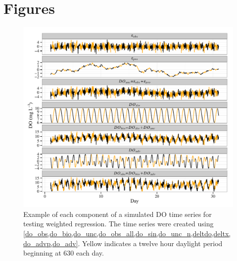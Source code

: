 \documentclass[letterpaper,12pt,oneside]{article}\usepackage[]{graphicx}\usepackage[]{color}
\makeatletter
\def\maxwidth{ %
  \ifdim\Gin@nat@width>\linewidth
    \linewidth
  \else
    \Gin@nat@width
  \fi
}
\newenvironment{knitrout}{}{} %
\makeatother
\begin{document}
\clearpage
\begin{singlespace}


\end{singlespace}
\clearpage


\section{Figures}

\centering\vspace*{\fill}
\begin{knitrout}
\color{fgcolor}\begin{figure}[!ht]


{\centering \includegraphics[width=\maxwidth]{figure/do_sim} 

}

\caption[Example of each component of a simulated \ac{DO} time series for testing weighted regression]{Example of each component of a simulated \ac{DO} time series for testing weighted regression.  The time series were created using \cref{do_obs,do_bio,do_unc,do_obs_all,do_sin,do_unc_n,deltdo,deltx,do_advp,do_adv}. Yellow indicates a twelve hour daylight period beginning at 630 each day.\label{fig:do_sim}}
\end{figure}


\end{knitrout}
\vfill
\clearpage
\end{document}
